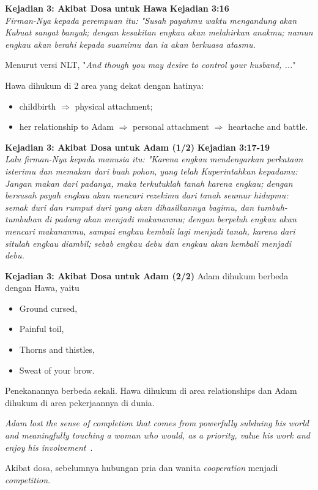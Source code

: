 \documentclass{beamer}
\theoremstyle{mystyle}
\begin{document}
\begin{frame}{\textbf{Kejadian 3: Akibat Dosa untuk Hawa}}
	\textbf{Kejadian 3:16} \\
	\textit{Firman-Nya kepada perempuan itu: "Susah payahmu waktu mengandung akan Kubuat sangat banyak; dengan kesakitan engkau akan melahirkan anakmu; namun engkau akan berahi kepada suamimu dan ia akan berkuasa atasmu.} 
	
	\bigskip
	
	Menurut versi NLT, "\textit{And though you may desire to control your husband, ...}"	
	
	\bigskip
	
	Hawa dihukum di 2 area yang dekat dengan hatinya:
	\begin{itemize}
		\item childbirth $\Rightarrow$ physical attachment;
		\item her relationship to Adam $\Rightarrow$ personal attachment $\Rightarrow$ heartache and battle.
	\end{itemize}	 
\end{frame}


\begin{frame}{\textbf{Kejadian 3: Akibat Dosa untuk Adam (1/2)}}
	\textbf{Kejadian 3:17-19} \\
	\textit{Lalu firman-Nya kepada manusia itu: "Karena engkau mendengarkan perkataan isterimu dan memakan dari buah pohon, yang telah Kuperintahkan kepadamu: Jangan makan dari padanya, maka terkutuklah tanah karena engkau; dengan bersusah payah engkau akan mencari rezekimu dari tanah seumur hidupmu: semak duri dan rumput duri yang akan dihasilkannya bagimu, dan tumbuh-tumbuhan di padang akan menjadi makananmu; dengan berpeluh engkau akan mencari makananmu, sampai engkau kembali lagi menjadi tanah, karena dari situlah engkau diambil; sebab engkau debu dan engkau akan kembali menjadi debu.}
\end{frame}

\begin{frame}{\textbf{Kejadian 3: Akibat Dosa untuk Adam (2/2)}}
	Adam dihukum berbeda dengan Hawa, yaitu
	\begin{itemize}
		\item Ground cursed,
		\item Painful toil,
		\item Thorns and thistles,
		\item Sweat of your brow.
	\end{itemize}
	Penekanannya berbeda sekali. Hawa dihukum di area relationships dan Adam dihukum di area pekerjaannya di dunia.
	
	\bigskip
	
	\textit{Adam lost the sense of completion that comes from powerfully subduing his world and meaningfully touching a woman who would, as a priority, value his work and enjoy his involvement}~\citep{crabb2013menandwomen}.

	\bigskip
	
	Akibat dosa, sebelumnya hubungan pria dan wanita \textit{cooperation} menjadi \textit{competition}.

\end{frame}
\end{document}
